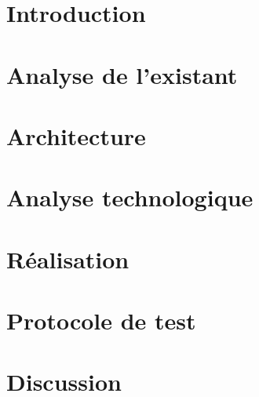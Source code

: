 \documentclass[a4paper, 12pt]{article}
\begin{document}
\section{Introduction} %

\newpage

\section{Analyse de l'existant} %

\newpage

\section{Architecture} %

\newpage

\section{Analyse technologique} %

\newpage

\section{Réalisation} %

\newpage

\section{Protocole de test} %

\newpage

\section{Discussion} %

\newpage
\end{document}
